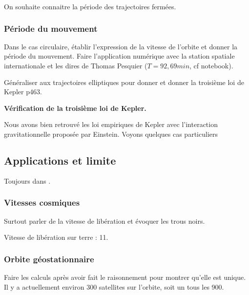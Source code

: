 \begin{transition}
On souhaite connaitre la période des trajectoires fermées.
\end{transition}

\subsubsection{Période du mouvement}

Dans le cas circulaire, établir l'expression de la vitesse de l'orbite et donner la période du mouvement.
Faire l'application numérique avec la station spatiale internationale et les dires de Thomas Pesquier ($T=\unit{92{,}69}{min}$, cf notebook).

Généraliser aux trajectoires elliptiques pour donner et donner la troisième loi de Kepler \cite{Michel2017} p463.

\begin{slide}
\textbf{Vérification de la troisième loi de Kepler.}
\end{slide}

\begin{transition}
Nous avons bien retrouvé les loi empiriques de Kepler avec l'interaction gravitationnelle proposée par Einstein.
Voyons quelques cas particuliers
\end{transition}

\subsection{Applications et limite}

Toujours dans \cite{Michel2017}.

\subsubsection{Vitesses cosmiques}

Surtout parler de la vitesse de libération et évoquer les trous noirs.

Vitesse de libération sur terre : \unit{11}{\kilo\meter\per\second}.

\subsubsection{Orbite géostationnaire}

Faire les calculs après avoir fait le raisonnement pour montrer qu'elle est unique.
Il y a actuellement environ 300 satellites sur l'orbite, soit un tous les \unit{900}{\kilo\meter}.

